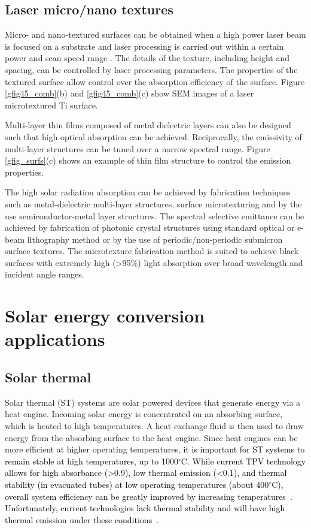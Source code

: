 \documentclass[review]{elsarticle}
\begin{document}
\subsection{Laser micro/nano textures}
Micro- and nano-textured surfaces can be obtained when a high power laser beam is 
focused on a substrate and laser processing is carried out within a certain power 
and scan speed range \cite{g28}.  The details of the texture, including height and spacing, can be controlled by laser processing parameters.  The properties of the textured surface allow control over the absorption efficiency of the surface. Figure \ref{gfig45_comb}(b) and \ref{gfig45_comb}(c) show SEM images of a laser microtextured Ti surface. 

Multi-layer thin films composed of metal dielectric layers can also be designed such that high optical absorption can be achieved.  Reciprocally, the emissivity of multi-layer structures can be tuned over a narrow spectral range. Figure \ref{gfig_surfs}(c) shows an example of thin film structure to control the emission properties. 

The high solar radiation absorption can be achieved by fabrication techniques such as metal-dielectric multi-layer structures, surface microtexturing and by the use semiconductor-metal layer structures. The spectral selective emittance can be achieved by fabrication of photonic crystal structures using standard optical or e-beam lithography method or by the use of periodic/non-periodic submicron surface textures.  The microtexture fabrication method is suited to achieve black surfaces with extremely high (\textgreater95\%) light absorption over broad wavelength and incident angle ranges.


\section{Solar energy conversion applications}
\subsection{Solar thermal}
Solar thermal (ST) systems are solar powered devices that generate energy via a heat engine.  Incoming solar energy is concentrated on an absorbing surface, which is heated to high temperatures.  A heat exchange fluid is then used to draw energy from the absorbing surface to the heat engine.  Since heat engines can be more efficient at higher operating temperatures, \textcolor{black}{it is important for ST systems to remain stable at high temperatures, up to 1000$^\circ$C.  While current TPV technology allows for high absorbance (\textgreater0.9), low thermal emission (\textless0.1), and thermal stability (in evacuated tubes) at low operating temperatures (about 400$^\circ$C), overall system efficiency can be greatly improved by increasing temperatures~\cite{ssolar,ying}.  Unfortunately, current technologies lack thermal stability and will have high thermal emission under these conditions~\cite{high_temp_review_ST}.}
\end{document}
